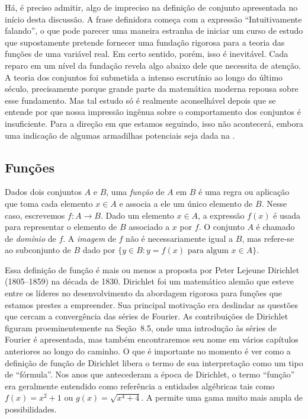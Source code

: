 Há, é preciso admitir, algo de impreciso na definição de conjunto apresentada no início desta discussão. A frase definidora começa com a expressão ``Intuitivamente falando'', o que pode parecer uma maneira estranha de iniciar um curso de estudo que supostamente pretende fornecer uma fundação rigorosa para a teoria das funções de uma variável real. Em certo sentido, porém, isso é inevitável. Cada reparo em um nível da fundação revela algo abaixo dele que necessita de atenção. A teoria dos conjuntos foi submetida a intenso escrutínio ao longo do último século, precisamente porque grande parte da matemática moderna repousa sobre esse fundamento. Mas tal estudo só é realmente aconselhável depois que se entende por que nossa impressão ingênua sobre o comportamento dos conjuntos é insuficiente. Para a direção em que estamos seguindo, isso não acontecerá, embora uma indicação de algumas armadilhas potenciais seja dada na .

\subsection{Funções}\label{subsec:funcoes}

  
\begin{definition}\label{def:funcao}
Dados dois conjuntos $A$ e $B$, uma \textit{função} de $A$ em $B$ é uma regra ou aplicação que toma cada elemento $x \in A$ e associa a ele um único elemento de $B$. Nesse caso, escrevemos $f \colon A \to B$. Dado um elemento $x \in A$, a expressão $f(x)$ é usada para representar o elemento de $B$ associado a $x$ por $f$. O conjunto $A$ é chamado de \textit{domínio} de $f$. A \textit{imagem} de $f$ não é necessariamente igual a $B$, mas refere-se ao subconjunto de $B$ dado por $\{y \in B : y = f(x) \text{ para algum } x \in A\}$.
\end{definition}

Essa definição de função é mais ou menos a proposta por Peter Lejeune Dirichlet (1805--1859) na década de 1830. Dirichlet foi um matemático alemão que esteve entre os líderes no desenvolvimento da abordagem rigorosa para funções que estamos prestes a empreender. Sua principal motivação era deslindar as questões que cercam a convergência das séries de Fourier. As contribuições de Dirichlet figuram proeminentemente na Seção~8.5, onde uma introdução às séries de Fourier é apresentada, mas também encontraremos seu nome em vários capítulos anteriores ao longo do caminho. O que é importante no momento é ver como a definição de função de Dirichlet libera o termo de sua interpretação como um tipo de ``fórmula''. Nos anos que antecederam a época de Dirichlet, o termo ``função'' era geralmente entendido como referência a entidades algébricas tais como $f(x) = x^{2} + 1$ ou $g(x) = \sqrt{x^{4} + 4}$. A  permite uma gama muito mais ampla de possibilidades.

